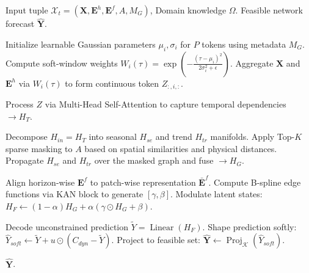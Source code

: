\begin{algorithm}[!t]
\caption{PhyST-Net Forward Pass}
\label{alg:physt_net}
\begin{algorithmic}[1]
\REQUIRE Input tuple $\mathcal{X}_t = (\mathbf{X}, \mathbf{E}^h, \mathbf{E}^f, A, M_G)$, Domain knowledge $\Omega$.
\ENSURE Feasible network forecast $\hat{\mathbf{Y}}$.

\STATE {}
\STATE Initialize learnable Gaussian parameters $\mu_i, \sigma_i$ for $P$ tokens using metadata $M_G$.
    \STATE Compute soft-window weights $W_i(\tau) = \exp\left(-\frac{(\tau-\mu_i)^2}{2\sigma_i^2+\epsilon}\right)$.
    \STATE Aggregate $\mathbf{X}$ and $\mathbf{E}^h$ via $W_i(\tau)$ to form continuous token $Z_{:,i,:}$.
\ENDFOR

\STATE {}
\STATE Process $Z$ via Multi-Head Self-Attention to capture temporal dependencies $\to H_T$.

\STATE {}
\STATE Decompose $H_{in} = H_T$ into seasonal $H_{se}$ and trend $H_{tr}$ manifolds.
\STATE Apply Top-$K$ sparse masking to $A$ based on spatial similarities and physical distances.
\STATE Propagate $H_{se}$ and $H_{tr}$ over the masked graph and fuse $\to H_G$.

\STATE {}
\STATE Align horizon-wise $\mathbf{E}^f$ to patch-wise representation $\bar{\mathbf{E}}^f$.
\STATE Compute B-spline edge functions via KAN block to generate $[\gamma, \beta]$.
\STATE Modulate latent states: $H_F \leftarrow (1-\alpha)H_G + \alpha(\gamma \odot H_G + \beta)$.

\STATE {}
\STATE Decode unconstrained prediction $\tilde{Y} = \operatorname{Linear}(H_F)$.
\STATE Shape prediction softly: $\hat{Y}_{soft} \leftarrow \tilde{Y} + u \odot (C_{dyn} - \tilde{Y})$.
\STATE Project to feasible set: $\hat{\mathbf{Y}} \leftarrow \operatorname{Proj}_{\mathcal{K}}(\hat{Y}_{soft})$.

\RETURN $\hat{\mathbf{Y}}$.
\end{algorithmic}
\end{algorithm}
